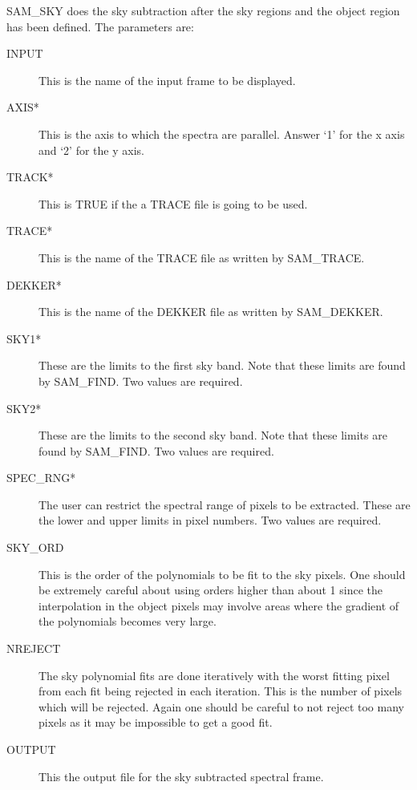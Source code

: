 SAM\_SKY does the sky subtraction after the sky regions and the object region
has been defined.  The parameters are:

\begin{description}
\begin{description}

\item[INPUT] This is the name of the input frame to be displayed.

\item[AXIS*] This is the axis to which the spectra are parallel.  Answer `1'
for the x axis and `2' for the y axis.

\item[TRACK*] This is TRUE if the a TRACE file is going to be used.

\item[TRACE*] This is the name of the TRACE file as written by SAM\_TRACE.

\item[DEKKER*] This is the name of the DEKKER file as written by SAM\_DEKKER.

\item[SKY1*] These are the limits to the first sky band.  Note that these
limits are found by SAM\_FIND.  Two values are required.

\item[SKY2*] These are the limits to the second sky band.  Note that these
limits are found by SAM\_FIND.  Two values are required.

\item[SPEC\_RNG*] The user can restrict the spectral range of pixels to be
extracted. These are the lower and upper limits in pixel numbers.  Two values
are required.

\item[SKY\_ORD] This is the order of the polynomials to be fit to the sky
pixels.  One should be extremely careful about using orders higher than about
1 since the interpolation in the object pixels may involve areas where the
gradient of the polynomials becomes very large.

\item[NREJECT]  The sky polynomial fits are done iteratively with the worst
fitting pixel from each fit being rejected in each iteration.  This is the 
number of pixels which will be rejected.  Again one should be careful to not
reject too many pixels as it may be impossible to get a good fit.

\item[OUTPUT] This the output file for the sky subtracted spectral frame.

\end{description}
\end{description}

